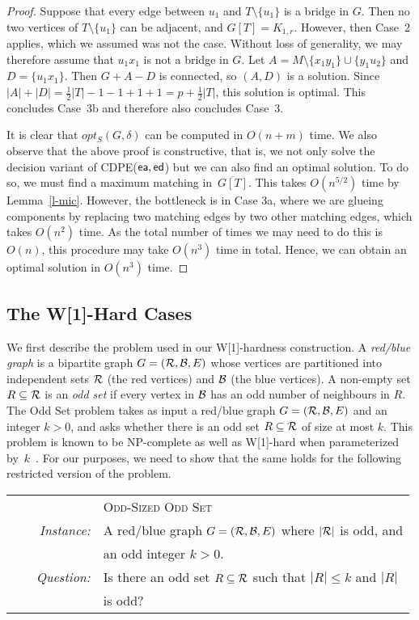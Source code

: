 \documentclass[11pt]{llncs}
\newcommand{\opts}{opt_S}
\newcommand{\ed}{{\sf ed}}
\newcommand{\ea}{{\sf ea}}
\newcommand{\cdpe}{{\sc CDPE}}
\newcommand{\NP}{{\sf NP}}
\newcommand{\W}{{\sf W[1]}}
\begin{document}
\begin{proof}
Suppose that every edge between $u_1$ and $T \setminus \{u_1\}$ is a bridge in
$G$. Then no two vertices of $T \setminus \{u_1\}$ can be adjacent, and
$G[T]=K_{1,r}$. However, then Case~2 applies, which we assumed was not the
case. Without loss of generality, we may therefore assume that $u_1x_1$ is not
a bridge in $G$. Let $A=M\setminus\{x_1y_1\}\cup\{y_1u_2\}$ and $D=\{u_1x_1\}$.
Then $G+A-D$ is connected, so $(A,D)$ is a solution. Since
$|A|+|D|=\frac{1}{2}|T|-1-1+1+1=p+\frac{1}{2}|T|$, this solution is optimal.
This concludes Case~3b and therefore also concludes Case~3.

\medskip
\noindent
It is clear that $\opts(G,\delta)$ can be computed in $O(n+m)$ time.  We also
observe that the above proof is constructive, that is, we not only solve the
decision variant of \cdpe($\ea,\ed$) but we can also find an optimal solution.
To do so, we must find a maximum matching in~$\overline{G[T]}$. This takes
$O(n^{5/2})$ time by Lemma~\ref{l-mic}.
However, the bottleneck is in Case 3a, where we are glueing components by replacing two matching edges by two other matching edges, which takes $O(n^2)$ time.
As the total number of times we may need to do this is $O(n)$, this procedure may take $O(n^3)$ time in total.
Hence, we can obtain an optimal solution in
$O(n^3)$ time.
\end{proof}

\subsection{The \W-Hard Cases}\label{s-wun}

We first describe the problem used in our \W-hardness construction.
A {\em red/blue graph} is a bipartite graph $G=({\cal R},{\cal B},E)$ whose
vertices are partitioned into independent sets ${\cal R}$ (the red vertices)
and ${\cal B}$ (the blue vertices). A non-empty set $R\subseteq {\cal R}$ is an
{\em odd set} if every vertex in ${\cal B}$ has an odd number of neighbours in
$R$. The {\sc Odd Set} problem takes as input a red/blue graph $G=({\cal
R},{\cal B},E)$ and an integer $k>0$, and asks whether there is an odd set
$R\subseteq {\cal R}$ of size at most $k$. This problem is known to be
\NP-complete as well as \W-hard when parameterized
by~$k$~\cite{DowneyFVW99}. For our purposes, we need to show that the same
holds for the following restricted version of the problem.

\begin{center}
\begin{boxedminipage}{.99\textwidth}
\begin{tabular}{rl}
& \textsc{Odd-Sized Odd Set}\\
\textit{~~~~Instance:} & A red/blue graph $G=({\cal R},{\cal B},E)$ where $|{\cal R}|$ is odd, and\\
                       & an odd integer $k>0$.\\
\textit{Question:} & Is there an odd set $R\subseteq {\cal R}$ such that $|R|\leq k$ and $|R|$\\ & is odd?\\
\end{tabular}
\end{boxedminipage}
\end{center}
\end{document}
